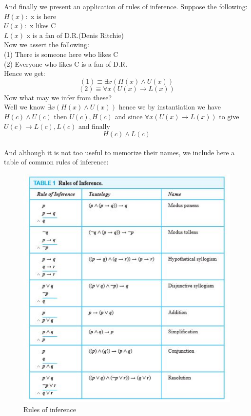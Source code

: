 \documentclass{article}
\theoremstyle{definition}
\numberwithin{equation}{subsection}
\numberwithin{remark}{subsection}
\begin{document}
And finally we present an application of rules of inference. Suppose the following:
\\
$H(x):$ x is here
\\
$U(x):$ x likes C
\\
$L(x)$ x is a fan of D.R.(Denis Ritchie)
\\
Now we assert the following:
\\
(1) There is someone here who likes C
\\
(2) Everyone who likes C is a fan of D.R.
\\
Hence we get:
$$(1) \equiv \exists x(H(x) \land U(x))$$
$$(2) \equiv \forall x(U(x) \rightarrow L(x))$$
Now what may we infer from these?
\\
Well we know  $\exists x(H(x) \land U(x))$ hence we by instantiation we have $H(c) \land U(c)$ then $U(c),H(c)$ and since $ \forall x(U(x) \rightarrow L(x))$ to give $U(c) \rightarrow L(c), L(c)$ and finally $$H(c)\land L(c)$$
\\
And although it is not too useful to memorize their names, we include here a table of common rules of inference: 


\begin{figure}[H]
    \centering
    \includegraphics[scale = 0.9]{epflSemesterOne/advancedComputation/figures/inference.JPG}
    \caption{Rules of inference}
\end{figure}
\end{document}
